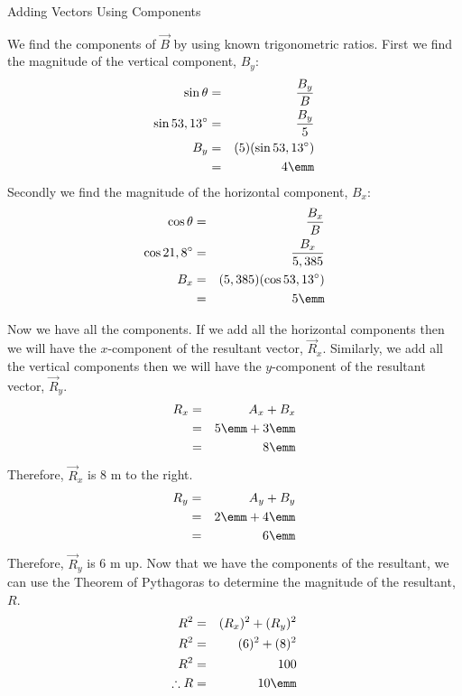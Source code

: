 \begin{wex}{Adding Vectors Using Components}
{
We find the components of $\vec{B}$ by using known trigonometric ratios. First we find the magnitude of the vertical component, $B_y$:
\begin{eqnarray*}
\sin{\theta} & = & \frac{B_y}{B} \\
\sin{53,13^\circ} & = &\frac{B_y}{5}\\
B_y & = & (5)(\sin{53,13^\circ})\\
& = & 4\emm
\end{eqnarray*}
Secondly we find the magnitude of the horizontal component, $B_x$:
\begin{eqnarray*}
\cos{\theta} &=& \frac{B_x}{B} \\
\cos{21,8^\circ} &=& \frac{B_x}{5,385}\\
B_x & = & (5,385) (\cos{53,13^\circ})\\
& = & 5\emm
\end{eqnarray*}
\begin{center}
\end{center}

Now we have all the components. If we add all the horizontal components then
we will have the $x$-component of the resultant vector, $\vec{R}_x$.  Similarly, we add all the vertical components then we will have the $y$-component of the resultant vector, $\vec{R}_y$.
\begin{eqnarray*}
R_x &=& A_x+B_x\\
&=&5\emm + 3\emm\\
&=&8\emm
\end{eqnarray*}
Therefore, $\vec{R}_x$ is 8 m to the right.
\begin{eqnarray*}
R_y &=& A_y+B_y\\
&=&2\emm + 4\emm\\
&=&6\emm
\end{eqnarray*}
Therefore, $\vec{R}_y$ is 6 m up.
Now that we have the components of the resultant, we can use the Theorem of Pythagoras to determine the magnitude of the resultant, $R$.
\begin{eqnarray*}
R^2&=&(R_x)^2 + (R_y)^2\\
R^2&=&(6)^2 + (8)^2\\
R^2&=&100\\
\therefore R&=&10\emm
\end{eqnarray*}

}
\end{wex}
